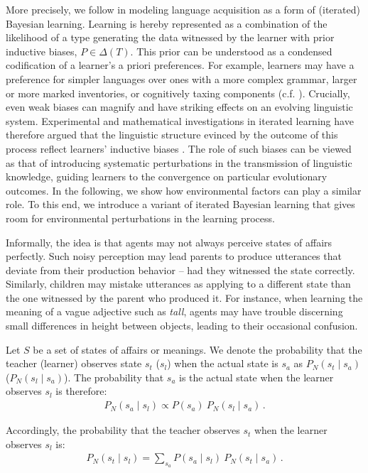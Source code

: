 \documentclass[10pt,a4paper]{article}
\begin{document}
More precisely, we follow \citet{griffiths+kalish:2007} in modeling language acquisition as a form of (iterated) Bayesian learning. Learning is hereby represented as a combination of the likelihood of a type generating the data witnessed by the learner with prior inductive biases, $P \in \Delta(T)$. This prior can be understood as a condensed codification of a learner's a priori preferences. For example, learners may have a preference for simpler languages over ones with a more complex grammar, larger or more marked inventories, or cognitively taxing components (c.f. \citealt{feldman:2000,chater+vitanyi:2003, kirby+etal:2015}). Crucially, even weak biases can magnify and have striking effects on an evolving linguistic system. Experimental and mathematical investigations in iterated learning have therefore argued that the linguistic structure evinced by the outcome of this process reflect learners' inductive biases \citep{kirby+etal:2007,kirby+etal:2014}. The role of such biases can be viewed as that of introducing systematic perturbations in the transmission of linguistic knowledge, guiding learners to the convergence on particular evolutionary outcomes. In the following, we show how environmental factors can play a similar role. To this end, we introduce a variant of iterated Bayesian learning that gives room for environmental perturbations in the learning process. 

Informally, the idea is that agents may not always perceive states of affairs perfectly. Such noisy perception may lead parents to produce utterances that deviate from their production behavior -- had they witnessed the state correctly. Similarly, children may mistake utterances as applying to a different state than the one witnessed by the parent who produced it. For instance, when learning the meaning of a vague adjective such as {\em tall}, agents may have trouble discerning small differences in height between objects, leading to their occasional confusion.

Let $S$ be a set of states of affairs or meanings. We denote the probability that the teacher (learner) observes state $s_t$ ($s_l$) when the actual state is $s_a$ as $P_N(s_t \mid s_a)$ ($P_N(s_l \mid s_a)$). The probability that $s_a$ is the actual state when the learner observes $s_l$ is therefore:
\begin{align*}
  P_N(s_a \mid s_l) \propto P(s_a) \ P_N(s_l \mid s_a)\,.
\end{align*}

Accordingly, the probability that the teacher observes $s_t$ when the learner observes $s_l$ is:
\begin{align*}
  P_N(s_t \mid s_l) = \sum_{s_a} P(s_a \mid s_l) \ P_N(s_t \mid s_a)\,.
\end{align*}
\end{document}
